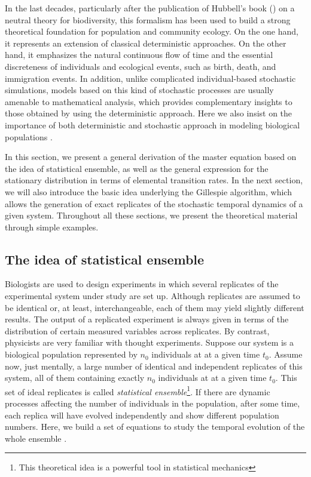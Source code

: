 \documentclass{article}
\begin{document}
In the last decades, particularly after the publication of Hubbell's book (\citeyear{Hubbell01}) on a neutral theory for biodiversity, this formalism has been used to build a strong theoretical foundation for population and community ecology. On the one hand, it represents an extension of classical deterministic approaches. On the other hand, it emphasizes the natural continuous flow of time and the essential discreteness of individuals and ecological events, such as birth, death, and immigration events. In addition, unlike complicated individual-based stochastic simulations, models based on this kind of stochastic processes are usually amenable to mathematical analysis, which provides complementary insights to those obtained by using the deterministic approach. Here we also insist on the importance of both deterministic and stochastic approach in modeling biological populations \citep{Nisbet82,Renshaw91}. 
\smallskip

In this section, we present a general derivation of the master equation based on the idea of statistical ensemble, as well as the general expression for the stationary distribution in terms of elemental transition rates. In the next section, we will also introduce the basic idea underlying the Gillespie algorithm, which allows the generation of exact replicates of the stochastic temporal dynamics of a given system. Throughout all these sections, we present the theoretical material through simple examples.

\subsection{The idea of statistical ensemble}
\label{master_equation}
Biologists are used to design experiments in which several replicates of the experimental system under study are set up. Although replicates are assumed to be identical or, at least, interchangeable, each of them may yield slightly different results. The output of a replicated experiment is always given in terms of the distribution of certain measured variables across replicates. By contrast, physicists are very familiar with thought experiments. Suppose our system is a biological population represented by $n_0$ individuals at at a given time $t_0$. Assume now, just mentally, a large number of identical and independent replicates of this system, all of them containing exactly $n_0$ individuals at at a given time $t_0$. This set of ideal replicates is called {\em statistical ensemble}\footnote{This theoretical idea is a powerful tool in statistical mechanics}. If there are dynamic processes affecting the number of individuals in the population, after some time, each replica will have evolved independently and show different population numbers. Here, we build a set of equations to study the temporal evolution of the whole ensemble \citep{Allen87}. 
\smallskip
\end{document}
